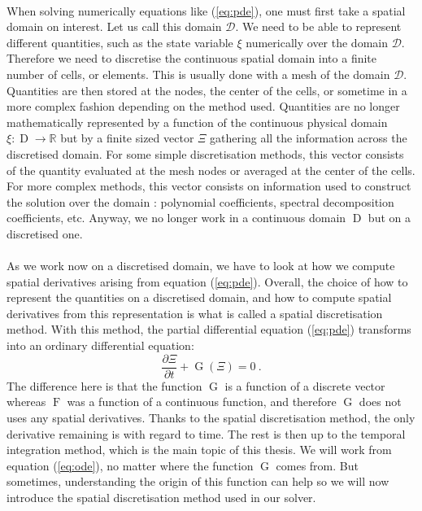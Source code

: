     \paragraph{}
    When solving numerically equations like (\ref{eq:pde}), one must first take a spatial domain on interest.
    Let us call this domain $\mathcal{D}$.
    We need to be able to represent different quantities, such as the state variable $\xi$ numerically over the domain $\mathcal{D}$.
    Therefore we need to discretise the continuous spatial domain into a finite number of cells, or elements.
    This is usually done with a mesh of the domain $\mathcal{D}$.
    Quantities are then stored at the nodes, the center of the cells, or sometime in a more complex fashion depending on the method used.
    Quantities are no longer mathematically represented by a function of the continuous physical domain $\xi : \operatorname{D} \rightarrow \mathbb{R}$ but by a finite sized vector $\Xi$ gathering all the information across the discretised domain.
    For some simple discretisation methods, this vector consists of the quantity evaluated at the mesh nodes or averaged at the center of the cells.
    For more complex methods, this vector consists on information used to construct the solution over the domain : polynomial coefficients, spectral decomposition coefficients, etc.
    Anyway, we no longer work in a continuous domain $\operatorname{D}$ but on a discretised one.

    \paragraph{}
    As we work now on a discretised domain, we have to look at how we compute spatial derivatives arising from equation (\ref{eq:pde}).
    Overall, the choice of how to represent the quantities on a discretised domain, and how to compute spatial derivatives from this representation is what is called a spatial discretisation method.
    With this method, the partial differential equation (\ref{eq:pde}) transforms into an ordinary differential equation:
    \begin{equation}\label{eq:ode}
      \frac{\partial \Xi}{\partial t} + \operatorname{G}\left(\Xi\right) = 0 \ .
    \end{equation}
    The difference here is that the function $\operatorname{G}$ is a function of a discrete vector whereas $\operatorname{F}$ was a function of a continuous function, and therefore $\operatorname{G}$ does not uses any spatial derivatives.
    Thanks to the spatial discretisation method, the only derivative remaining is with regard to time.
    The rest is then up to the temporal integration method, which is the main topic of this thesis.
    We will work from equation (\ref{eq:ode}), no matter where the function $\operatorname{G}$ comes from.
    But sometimes, understanding the origin of this function can help so we will now introduce the spatial discretisation method used in our solver.



